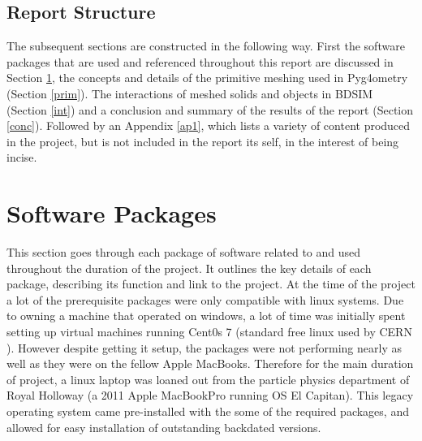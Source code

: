 \documentclass[12pt,a4paper]{article}
\begin{document}
\subsection{Report Structure}
The subsequent sections are constructed in the following way. First the software packages that are used and referenced throughout this report are discussed in Section \ref{packs}, the concepts and details of the primitive meshing used in Pyg4ometry (Section \ref{prim}). The interactions of meshed solids and objects in BDSIM (Section \ref{int}) and a conclusion and summary of the results of the report (Section \ref{conc}). Followed by an Appendix \ref{ap1}, which lists a variety of content produced in the project, but is not included in the report its self, in the interest of being incise.



\section{Software Packages}
\label{packs}
This section goes through each package of software related to and used throughout the duration of the project. It outlines the key details of each package, describing its function and link to the project. At the time of the project a lot of the prerequisite packages were only compatible with linux systems. Due to owning a machine that operated on windows, a lot of time was initially spent setting up virtual machines running Cent0s 7 (standard free linux used by CERN \cite{cern}). However despite getting it setup, the packages were not performing nearly as well as they were on the fellow Apple MacBooks. Therefore for the main duration of project, a linux laptop was loaned out from the particle physics department of Royal Holloway (a 2011 Apple MacBookPro running OS El Capitan). This legacy operating system came pre-installed with the some of the required packages, and allowed for easy installation of outstanding backdated versions.
\end{document}
